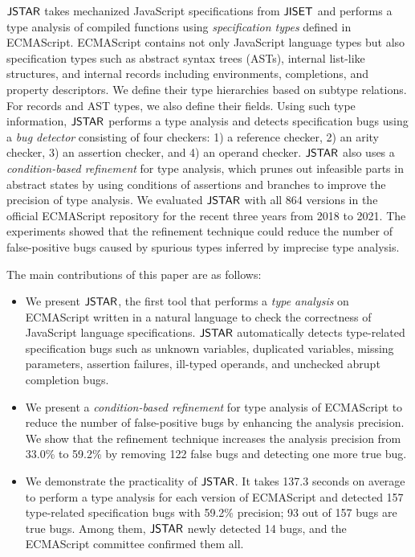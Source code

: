 $\tool$ takes mechanized JavaScript specifications from $\jiset$ and performs
a type analysis of compiled functions using \textit{specification types}
defined in ECMAScript.  ECMAScript contains not only JavaScript
language types but also specification types such as abstract syntax
trees (ASTs), internal list-like structures, and internal records
including environments, completions, and property descriptors.
We define their type hierarchies based on subtype relations.
For records and AST types, we also define their fields.
Using such type information, $\tool$ performs a type analysis and detects specification bugs using
a \textit{bug detector} consisting of four checkers: 1) a reference
checker, 2) an arity checker, 3) an assertion checker, and 4) an operand checker.
$\tool$ also uses a \textit{condition-based refinement} for type
analysis, which prunes out infeasible parts in abstract states by using conditions
of assertions and branches to improve the precision of type analysis.
We evaluated $\tool$ with all 864 versions in the official
ECMAScript repository for the recent three years from 2018 to 2021.
The experiments showed that the refinement technique could reduce the number of
false-positive bugs caused by spurious types inferred by imprecise type analysis.

The main contributions of this paper are as follows:
\begin{itemize}
  \item We present $\tool$, the first tool that performs a \textit{type
    analysis} on ECMAScript written in a natural language to check the correctness of JavaScript language
    specifications.  $\tool$ automatically detects type-related specification
    bugs such as unknown variables, duplicated variables, missing
    parameters, assertion failures, ill-typed operands, and unchecked
    abrupt completion bugs.
  \item We present a \textit{condition-based refinement} for type analysis of
    ECMAScript to reduce the number of false-positive bugs by enhancing the analysis
    precision.  We show that the refinement technique increases the analysis
    precision from 33.0\% to 59.2\% by removing 122
    false bugs and detecting one more true bug.
  \item We demonstrate the practicality of $\tool$. It takes 137.3
    seconds on average to perform a type analysis for each version of ECMAScript and detected
    157 type-related specification bugs with 59.2\% precision;
    93 out of 157 bugs are true bugs.  Among them, $\tool$
    newly detected 14 bugs, and the ECMAScript committee confirmed them all.
\end{itemize}
